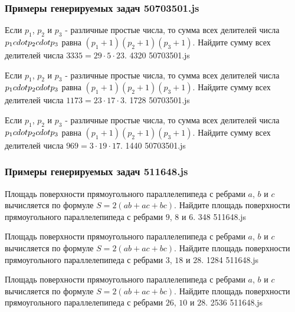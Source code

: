 \subsubsection*{Примеры генерируемых задач 50703501.js}   

\par{Если $p_1$, $p_2$ и $p_3$ - различные простые числа, то сумма всех делителей числа $p_1\\cdot p_2\\cdot p_3$ равна $(p_1+1)(p_2+1)(p_3+1)$. Найдите сумму всех делителей числа $3335=29\cdot5\cdot23$. }{ 4320 }{50703501.js}
\par{Если $p_1$, $p_2$ и $p_3$ - различные простые числа, то сумма всех делителей числа $p_1\\cdot p_2\\cdot p_3$ равна $(p_1+1)(p_2+1)(p_3+1)$. Найдите сумму всех делителей числа $1173=23\cdot17\cdot3$. }{ 1728 }{50703501.js}
\par{Если $p_1$, $p_2$ и $p_3$ - различные простые числа, то сумма всех делителей числа $p_1\\cdot p_2\\cdot p_3$ равна $(p_1+1)(p_2+1)(p_3+1)$. Найдите сумму всех делителей числа $969=3\cdot19\cdot17$. }{ 1440 }{50703501.js}


\subsubsection*{Примеры генерируемых задач 511648.js}   

\par{Площадь поверхности прямоугольного параллелепипеда с ребрами $a$, $b$ и $c$ вычисляется по формуле $S=2(ab+ac+bc)$. Найдите площадь поверхности прямоугольного параллелепипеда с ребрами $9$, $8$ и $6$. }{ 348 }{511648.js}
\par{Площадь поверхности прямоугольного параллелепипеда с ребрами $a$, $b$ и $c$ вычисляется по формуле $S=2(ab+ac+bc)$. Найдите площадь поверхности прямоугольного параллелепипеда с ребрами $3$, $18$ и $28$. }{ 1284 }{511648.js}
\par{Площадь поверхности прямоугольного параллелепипеда с ребрами $a$, $b$ и $c$ вычисляется по формуле $S=2(ab+ac+bc)$. Найдите площадь поверхности прямоугольного параллелепипеда с ребрами $26$, $10$ и $28$. }{ 2536 }{511648.js}


